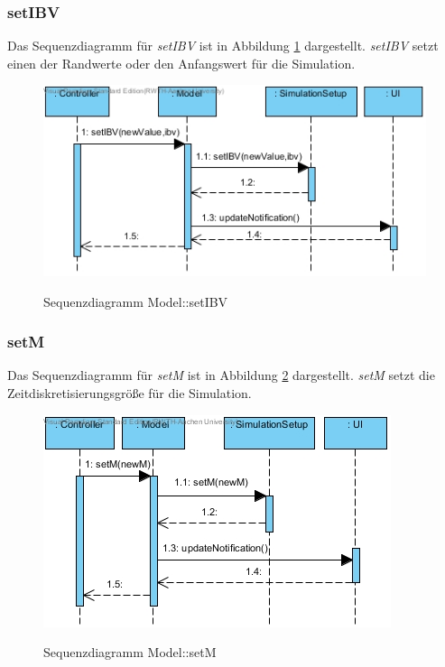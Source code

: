 \subsubsection*{setIBV}

Das Sequenzdiagramm für \emph{setIBV} ist in Abbildung \ref{Sequenzdiagramm Model::setIBV} dargestellt. \emph{setIBV} setzt einen der Randwerte oder den Anfangswert für die Simulation.

\begin{figure}[H]
	\centering
	\includegraphics[scale=.85]{Bilder/Model__setIBV().jpg}\\
	\caption{Sequenzdiagramm Model::setIBV}
	\label{Sequenzdiagramm Model::setIBV}
\end{figure}

\subsubsection*{setM}

Das Sequenzdiagramm für \emph{setM} ist in Abbildung \ref{Sequenzdiagramm Model::setM} dargestellt. \emph{setM} setzt die Zeitdiskretisierungsgröße für die Simulation.

\begin{figure}[H]
	\centering
	\includegraphics[scale=.85]{Bilder/Model__setM().jpg}\\
	\caption{Sequenzdiagramm Model::setM}
	\label{Sequenzdiagramm Model::setM}
\end{figure}

